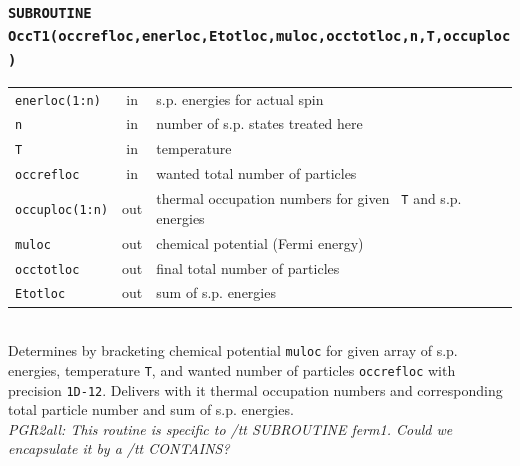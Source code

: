 \documentclass[final,1p]{elsarticle}
\newcommand{\PGRcomm}[1]{{\color{blue}\small\em PGR2all: #1}}
\begin{document}
\subsubsection*{\tt SUBROUTINE OccT1(occrefloc,enerloc,Etotloc,muloc,occtotloc,n,T,occuploc)}
\begin{tabular}{lcl}
 {\tt enerloc(1:n)} & in & s.p. energies for actual spin\\
 {\tt n} & in & number of s.p. states treated here\\
 {\tt T} & in & temperature\\
 {\tt occrefloc} & in & wanted total number of particles \\
 {\tt occuploc(1:n)} & out & thermal occupation numbers for given {\tt
   T} and s.p. energies\\
 {\tt muloc} & out & chemical potential (Fermi energy)\\
 {\tt occtotloc} & out& final total number of particles \\
 {\tt Etotloc} & out& sum of s.p. energies \\
\end{tabular}
\\[4pt]
Determines by bracketing chemical potential {\tt muloc} for given array of
s.p. energies, temperature {\tt T}, and wanted number of particles
{\tt occrefloc} with precision {\tt 1D-12}. Delivers with it
thermal occupation numbers and corresponding total particle number and
sum of s.p. energies.
\\
\PGRcomm{This routine is specific to {/tt SUBROUTINE ferm1}. Could we
encapsulate it by a {/tt CONTAINS}?}
\end{document}
